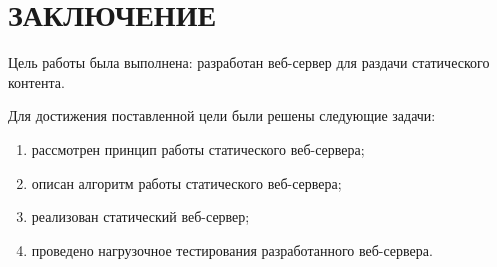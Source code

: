 \chapter*{ЗАКЛЮЧЕНИЕ}

Цель работы была выполнена: разработан веб-сервер для раздачи статического контента.

Для достижения поставленной цели были решены следующие задачи:

\begin{enumerate}[label=\arabic*)]
	\item рассмотрен принцип работы статического веб-сервера;
	\item описан алгоритм работы статического веб-сервера;
	\item реализован статический веб-сервер;
	\item проведено нагрузочное тестирования разработанного веб-сервера.
\end{enumerate}